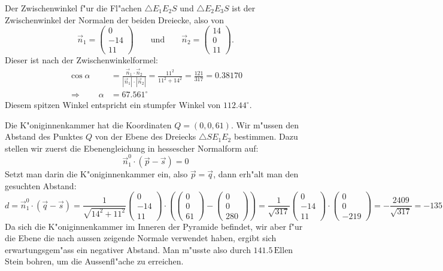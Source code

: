 \begin{loesung}
\begin{teilaufgaben}
\item
Der Zwischenwinkel f"ur die Fl"achen $\triangle E_1E_2S$ und
$\triangle E_2E_3S$ ist der Zwischenwinkel der Normalen der beiden
Dreiecke, also von
\[
\vec n_1
=
\begin{pmatrix} 0\\-14\\11 \end{pmatrix}
\qquad\text{und}\qquad
\vec n_2
=
\begin{pmatrix} 14\\0\\11 \end{pmatrix}.
\]
Dieser ist nach der Zwischenwinkelformel:
\begin{align*}
\cos\alpha
&=
\frac{\vec n_1\cdot \vec n_2}{|\vec n_1|\cdot|\vec n_2|}
=
\frac{11^2}{11^2+14^2}=\frac{121}{317}=0.38170
\\
\Rightarrow\qquad
\alpha
&=
67.561^\circ
\end{align*}
Diesem spitzen Winkel entspricht ein stumpfer Winkel von $112.44^\circ$.
\item
Die K"oniginnenkammer hat die Koordinaten $Q=(0,0,61)$.
Wir m"ussen den Abstand des Punktes $Q$ von der Ebene des Dreiecks
$\triangle SE_1E_2$ bestimmen.
Dazu stellen wir zuerst die Ebenengleichung in hessescher Normalform
auf:
\[
\vec n_1^0 \cdot (\vec p-\vec s)=0
\]
Setzt man darin die K"oniginnenkammer ein,  also $\vec p=\vec q$, dann
erh"alt man den gesuchten Abstand:
\[
d
=
\vec n_1^0 \cdot (\vec q-\vec s)
=
\frac1{\sqrt{14^2+11^2}}
\begin{pmatrix}0\\-14\\11 \end{pmatrix}
\cdot
\left(
\begin{pmatrix}0\\0\\61\end{pmatrix}
-
\begin{pmatrix}0\\0\\280\end{pmatrix}
\right)
=
\frac1{\sqrt{317}}
\begin{pmatrix}0\\-14\\11 \end{pmatrix}
\cdot
\begin{pmatrix}0\\0\\-219\end{pmatrix}
=
-\frac{2409}{\sqrt{317}}=-135.30
\]
Da sich die K"oniginnenkammer im Inneren der Pyramide befindet, wir aber
f"ur die Ebene die nach aussen zeigende Normale verwendet haben, ergibt
sich erwartungsgem"ass ein negativer Abstand.
Man m"usste also durch $141.5\,\text{Ellen}$ Stein bohren, um die Aussenfl"ache
zu erreichen.
\end{teilaufgaben}
\end{loesung}

